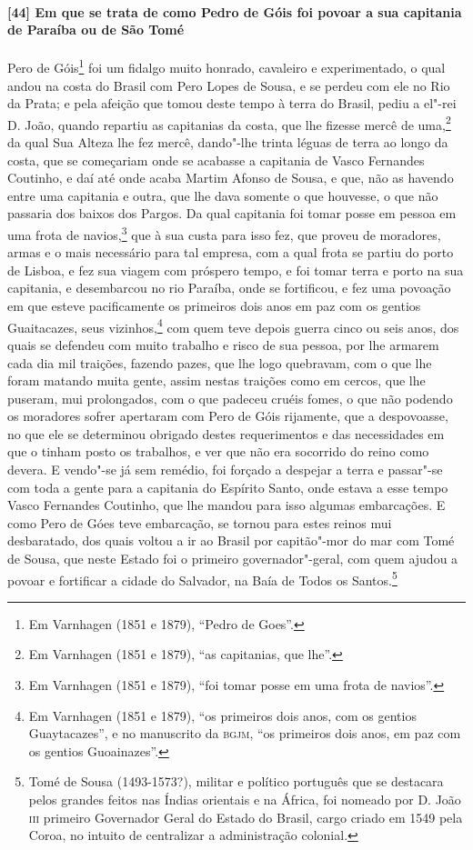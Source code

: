 \begin{linenumbers}
\paragraph{[44] Em que se trata de como Pedro de Góis foi povoar a sua capitania de Paraíba
ou de São Tomé} \quad
Pero de Góis\footnote{ Em Varnhagen (1851 e 1879), ``Pedro de Goes''.} foi um fidalgo
muito honrado, cavaleiro e experimentado, o qual andou na costa do Brasil com Pero Lopes
de Sousa, e se perdeu com ele no Rio da Prata; e pela afeição que tomou deste tempo à
terra do Brasil, pediu a el"-rei D. João, quando repartiu as capitanias da costa, que lhe
fizesse mercê de uma,\footnote{ Em Varnhagen (1851 e 1879), ``as capitanias, que lhe''.}
da qual Sua Alteza lhe fez mercê, dando"-lhe trinta léguas de terra ao longo da costa, que
se começariam onde se acabasse a capitania de Vasco Fernandes Coutinho, e daí até onde
acaba Martim Afonso de Sousa, e que, não as havendo entre uma capitania e outra, que lhe
dava somente o que houvesse, o que não passaria dos baixos dos Pargos. Da qual capitania
foi tomar posse em pessoa em uma frota de navios,\footnote{ Em Varnhagen (1851 e 1879),
``foi tomar posse em uma frota de navios''.} que à sua custa para isso fez, que proveu de
moradores, armas e o mais necessário para tal empresa, com a qual frota se partiu do porto
de Lisboa, e fez sua viagem com próspero tempo, e foi tomar terra e porto na sua
capitania, e desembarcou no rio Paraíba, onde se fortificou, e fez uma povoação em que
esteve pacificamente os primeiros dois anos em paz com os gentios Guaitacazes, seus
vizinhos,\footnote{ Em Varnhagen (1851 e 1879), ``os primeiros dois anos, com os gentios
Guaytacazes'', e no manuscrito da \textsc{bgjm}, ``os primeiros dois anos, em paz com os
gentios Guoainazes''.} com quem teve depois guerra cinco ou seis anos, dos quais se
defendeu com muito trabalho e risco de sua pessoa, por lhe armarem cada dia mil traições,
fazendo pazes, que lhe logo quebravam, com o que lhe foram matando muita gente, assim
nestas traições como em cercos, que lhe puseram, mui prolongados, com o que padeceu cruéis
fomes, o que não podendo os moradores sofrer apertaram com Pero de Góis rijamente, que a
despovoasse, no que ele se determinou obrigado destes requerimentos e das necessidades em
que o tinham posto os trabalhos, e ver que não era socorrido do reino como devera. E
vendo"-se já sem remédio, foi forçado a despejar a terra e passar"-se com toda a gente para
a capitania do Espírito Santo, onde estava a esse tempo Vasco Fernandes Coutinho, que lhe
mandou para isso algumas embarcações. E como Pero de Góes teve embarcação, se tornou para
estes reinos mui desbaratado, dos quais voltou a ir ao Brasil por capitão"-mor do mar com
Tomé de Sousa, que neste Estado foi o primeiro governador"-geral, com quem ajudou a povoar
e fortificar a cidade do Salvador, na Baía de Todos os Santos.\footnote{ Tomé de Sousa
(1493-1573?), militar e político português que se destacara pelos grandes feitos nas
Índias orientais e na África, foi nomeado por D. João \textsc{iii} primeiro Governador
Geral do Estado do Brasil, cargo criado em 1549 pela Coroa, no intuito de centralizar a
administração colonial.}


\end{linenumbers}
